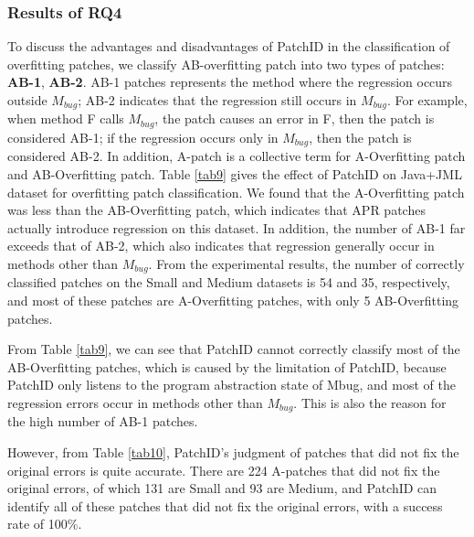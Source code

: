 \subsubsection{Results of RQ4}\label{5.3.4}
To discuss the advantages and disadvantages of PatchID in the classification of overfitting patches, we classify AB-overfitting patch into two types of patches: \textbf{AB-1},\textbf{ AB-2}. AB-1 patches represents the method where the regression occurs outside  $M_{bug}$; AB-2 indicates that the regression still occurs in  $M_{bug}$. For example, when method F calls  $M_{bug}$, the patch causes an error in F, then the patch is considered AB-1; if the regression occurs only in  $M_{bug}$, then the patch is considered AB-2. In addition, A-patch is a collective term for A-Overfitting patch and AB-Overfitting patch. Table \ref{tab9} gives the effect of PatchID on Java+JML dataset for overfitting patch classification. We found that the A-Overfitting patch was less than the AB-Overfitting patch, which indicates that APR patches actually introduce regression on this dataset. In addition, the number of AB-1 far exceeds that of AB-2, which also indicates that regression generally occur in methods other than  $M_{bug}$. From the experimental results, the number of correctly classified patches on the Small and Medium datasets is 54 and 35, respectively, and most of these patches are A-Overfitting patches, with only 5 AB-Overfitting patches.

From Table \ref{tab9}, we can see that PatchID cannot correctly classify most of the AB-Overfitting patches, which is caused by the limitation of PatchID, because PatchID only listens to the program abstraction state of Mbug, and most of the regression errors occur in methods other than $M_{bug}$. This is also the reason for the high number of AB-1 patches.

However, from Table \ref{tab10}, PatchID's judgment of patches that did not fix the original errors is quite accurate. There are 224 A-patches  that did not fix the original errors, of which 131 are Small and 93 are Medium, and PatchID can identify all of these patches that did not fix the original errors, with a success rate of 100\%.

